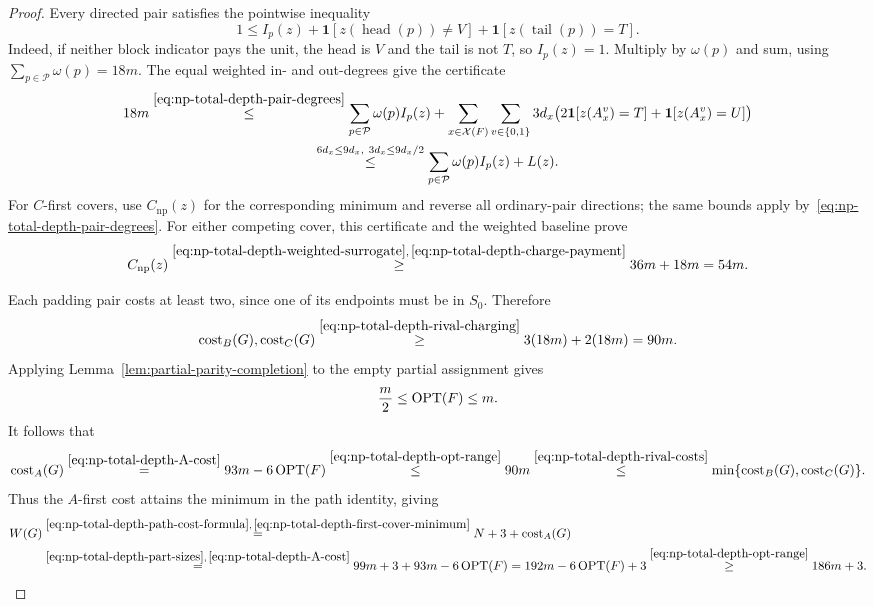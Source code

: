 \begin{proof}
Every directed pair satisfies the pointwise inequality
\[
 1\leq I_p(z)+\mathbf1[z(\operatorname{head}(p))\ne V]
                  +\mathbf1[z(\operatorname{tail}(p))=T].
\]
Indeed, if neither block indicator pays the unit, the head is $V$
and the tail is not $T$, so $I_p(z)=1$. Multiply by $\omega(p)$
and sum, using $\sum_{p\in\mathcal P}\omega(p)=18m$.
The equal weighted in- and out-degrees give the certificate
\begin{equation}\label{eq:np-total-depth-charge-payment}
\begin{gathered}
 18m
 \overset{\eqref{eq:np-total-depth-pair-degrees}}{\leq}
 \sum_{p\in\mathcal P}\omega(p)I_p(z)+\sum_{x\in\mathcal X(F)}\sum_{v\in\{0,1\}}
   3d_x\bigl(2\mathbf1[z(A_x^v)=T]+\mathbf1[z(A_x^v)=U]\bigr)\\
 \overset{6d_x\leq9d_x,\ 3d_x\leq9d_x/2}{\leq}
 \sum_{p\in\mathcal P}\omega(p)I_p(z)+L(z).
\end{gathered}
\end{equation}
For $C$-first covers, use $C_{\mathrm{np}}(z)$ for the corresponding
minimum and reverse all ordinary-pair directions; the same bounds
apply by~\eqref{eq:np-total-depth-pair-degrees}.
For either competing cover, this certificate and the weighted baseline
prove
\begin{equation}\label{eq:np-total-depth-rival-charging}
 C_{\mathrm{np}}(z)
 \overset{\eqref{eq:np-total-depth-weighted-surrogate},\,
          \eqref{eq:np-total-depth-charge-payment}}{\geq}36m+18m=54m.
\end{equation}

Each padding pair costs at least two, since one of its endpoints must
be in $S_0$. Therefore
\begin{equation}\label{eq:np-total-depth-rival-costs}
 \operatorname{cost}_B(G),\operatorname{cost}_C(G)
 \overset{\eqref{eq:np-total-depth-rival-charging}}{\geq}
 3(18m)+2(18m)=90m.
\end{equation}
Applying Lemma~\ref{lem:partial-parity-completion} to the empty
partial assignment gives
\begin{equation}\label{eq:np-total-depth-opt-range}
 \frac m2\leq\operatorname{OPT}(F)\leq m.
\end{equation}
It follows that
\begin{equation}\label{eq:np-total-depth-first-cover-minimum}
 \operatorname{cost}_A(G)
 \overset{\eqref{eq:np-total-depth-A-cost}}{=}93m-6\operatorname{OPT}(F)
  \overset{\eqref{eq:np-total-depth-opt-range}}{\leq}90m
 \overset{\eqref{eq:np-total-depth-rival-costs}}{\leq}
  \min\{\operatorname{cost}_B(G),\operatorname{cost}_C(G)\}.
\end{equation}
Thus the $A$-first cost attains the minimum in the path identity, giving
\[
\begin{aligned}
 W(G)&\overset{\eqref{eq:np-total-depth-path-cost-formula},\,
                    \eqref{eq:np-total-depth-first-cover-minimum}}{=}
       N+3+\operatorname{cost}_A(G)\\
 &\overset{\eqref{eq:np-total-depth-part-sizes},\,\eqref{eq:np-total-depth-A-cost}}{=}
       99m+3+93m-6\operatorname{OPT}(F)=192m-6\operatorname{OPT}(F)+3
  \overset{\eqref{eq:np-total-depth-opt-range}}{\geq}186m+3.
\end{aligned}
\]
\end{proof}

